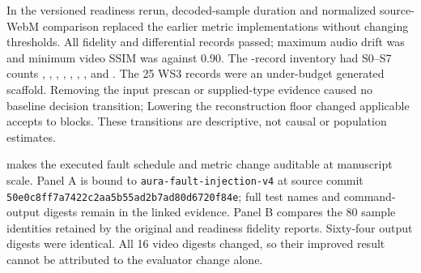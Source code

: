 In the versioned readiness rerun, decoded-sample duration and normalized
source-WebM comparison replaced the earlier metric implementations without
changing thresholds. All \AFDReadinessFidelity{} fidelity and
\AFDReadinessDifferential{} differential records passed; maximum audio drift
was \AFDReadinessAudioMaxDrift{} and minimum video SSIM was
\AFDReadinessVideoMinSsim{} against 0.90. The
\AFDReadinessRehearsalTotal{}-record inventory had S0--S7 counts
\AFDReadinessStratumZero{}, \AFDReadinessStratumOne{},
\AFDReadinessStratumTwo{}, \AFDReadinessStratumThree{},
\AFDReadinessStratumFour{}, \AFDReadinessStratumFive{},
\AFDReadinessStratumSix{}, and \AFDReadinessStratumSeven{}. The 25 WS3 records
were an under-budget generated scaffold. Removing the input prescan or
supplied-type evidence caused no baseline decision transition;
Lowering the reconstruction floor changed \AFDReadinessLoweredFloorTransitions{}
applicable accepts to blocks. These transitions are descriptive, not causal or
population estimates.

 makes the executed fault schedule and metric
change auditable at manuscript scale. Panel A is bound to
\texttt{aura-fault-injection-v4} at source commit
\texttt{50e0c8ff7a7422c2aa5b55ad2b7ad80d6720f84e}; full test names and command-
output digests remain in the linked evidence. Panel B compares the 80 sample
identities retained by the original and readiness fidelity reports. Sixty-four
output digests were identical. All 16 video digests changed, so their improved
result cannot be attributed to the evaluator change alone.

